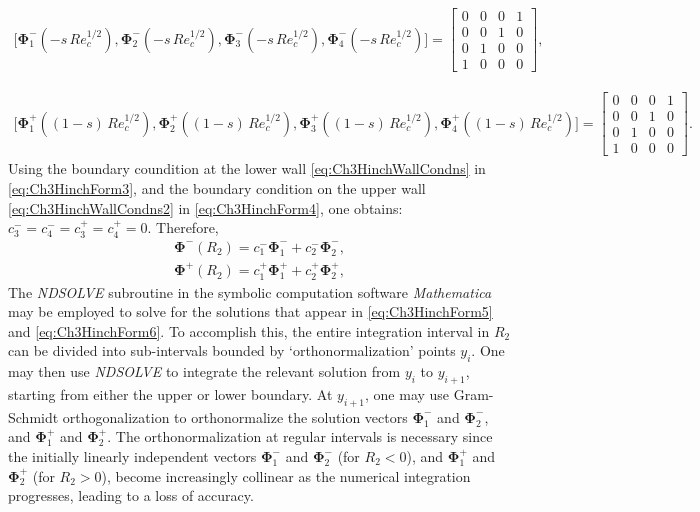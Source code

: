 \documentclass{jfm}
\begin{document}
 \begin{align}
 \big[\bm{\Phi}_1^-(-s\,Re_c^{1/2}),\bm{\Phi}_2^-(-s\,Re_c^{1/2}),\bm{\Phi}_3^-(-s\,Re_c^{1/2}),\bm{\Phi}_4^-(-s\,Re_c^{1/2})\big] =\begin{bmatrix}
 0 & 0 & 0 & 1\\
 0 & 0 & 1 & 0\\
 0 & 1 & 0 & 0\\
 1 & 0 & 0 & 0
 \end{bmatrix},
 \label{eq:Ch3HinchWallCondns}
 \end{align}
 
  \begin{align}
 \big[\bm{\Phi}_1^+((1-s)\,Re_c^{1/2}),\bm{\Phi}_2^+((1-s)\,Re_c^{1/2}),\bm{\Phi}_3^+((1-s)\,Re_c^{1/2}),\bm{\Phi}_4^+((1-s)\,Re_c^{1/2})\big] =\begin{bmatrix}
 0 & 0 & 0 & 1\\
 0 & 0 & 1 & 0\\
 0 & 1 & 0 & 0\\
 1 & 0 & 0 & 0
 \end{bmatrix}.
 \label{eq:Ch3HinchWallCondns2}
 \end{align}
Using the boundary coundition at the lower wall \eqref{eq:Ch3HinchWallCondns} in \eqref{eq:Ch3HinchForm3}, and the boundary condition on the upper wall \eqref{eq:Ch3HinchWallCondns2} in \eqref{eq:Ch3HinchForm4}, one obtains: $c_3^-=c_4^-=c_3^+=c_4^+=0$. Therefore,
\begin{align} 
\bm{\Phi}^-(R_2)=c_1^- \bm{\Phi}_1^- + c_2^- \bm{\Phi}_2^-,\label{eq:Ch3HinchForm5}\\
\bm{\Phi}^+(R_2)=c_1^+ \bm{\Phi}_1^+ + c_2^+ \bm{\Phi}_2^+,\label{eq:Ch3HinchForm6}
\end{align} 
The \textit{NDSOLVE} subroutine in the symbolic computation software \textit{Mathematica} may be employed to solve for the solutions that appear in \eqref{eq:Ch3HinchForm5} and \eqref{eq:Ch3HinchForm6}.  To accomplish this, the entire integration interval in  $R_2$ can be divided into sub-intervals bounded by `orthonormalization' points $y_i$. One may then use \textit{NDSOLVE} to integrate the relevant solution from $y_i$ to $y_{i+1}$, starting from either the upper or lower boundary. At $y_{i+1}$, one may use Gram-Schmidt orthogonalization to orthonormalize the solution vectors $\bm{\Phi}_1^-$ and $\bm{\Phi}_2^-$, and $\bm{\Phi}_1^+$ and $\bm{\Phi}_2^+$. The orthonormalization at regular intervals is necessary since the initially linearly independent vectors $\bm{\Phi}_1^-$ and $\bm{\Phi}_2^-$ (for $R_2<0$), and $\bm{\Phi}_1^+$ and $\bm{\Phi}_2^+$ (for $R_2>0$), become increasingly collinear as the numerical integration progresses, leading to a loss of accuracy.
\end{document}
